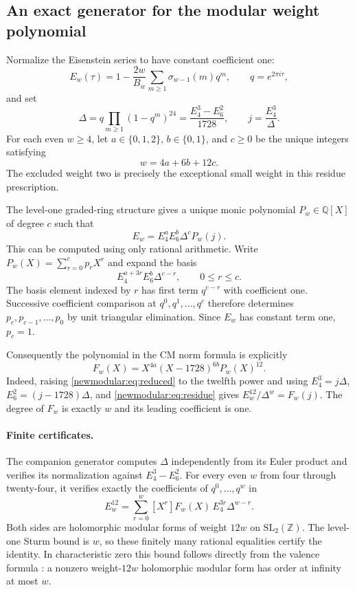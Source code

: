 \subsection{An exact generator for the modular weight polynomial}
\label{newmodular:sec:generator}

Normalize the Eisenstein series to have constant coefficient one:
\[
 E_w(\tau)=1-\frac{2w}{B_w}\sum_{m\ge1}\sigma_{w-1}(m)q^m,
 \qquad q=e^{2\pi i\tau},
\]
and set
\[
 \Delta=q\prod_{m\ge1}(1-q^m)^{24}
       =\frac{E_4^3-E_6^2}{1728},\qquad j=\frac{E_4^3}{\Delta}.
\]
For each even $w\ge4$, let $a\in\{0,1,2\}$, $b\in\{0,1\}$, and
$c\ge0$ be the unique integers satisfying
\begin{equation}\label{newmodular:eq:residue}
 w=4a+6b+12c.
\end{equation}
The excluded weight two is precisely the exceptional small weight in
this residue prescription.

The level-one graded-ring structure \cite{Stein} gives a unique monic polynomial
$P_w\in\mathbb Q[X]$ of degree $c$ such that
\begin{equation}\label{newmodular:eq:reduced}
 E_w=E_4^aE_6^b\Delta^cP_w(j).
\end{equation}
This can be computed using only rational arithmetic.  Write
$P_w(X)=\sum_{r=0}^c p_rX^r$ and expand the basis
\[
 E_4^{a+3r}E_6^b\Delta^{c-r},\qquad 0\le r\le c.
\]
The basis element indexed by $r$ has first term $q^{c-r}$ with
coefficient one.  Successive coefficient comparison at
$q^0,q^1,\ldots,q^c$ therefore determines $p_c,p_{c-1},\ldots,p_0$
by unit triangular elimination.  Since $E_w$ has constant term one,
$p_c=1$.

Consequently the polynomial in the CM norm formula is explicitly
\begin{equation}\label{newmodular:eq:F-factor}
 \boxed{\displaystyle
 F_w(X)=X^{4a}(X-1728)^{6b}P_w(X)^{12}.}
\end{equation}
Indeed, raising \eqref{newmodular:eq:reduced} to the twelfth power and
using $E_4^3=j\Delta$, $E_6^2=(j-1728)\Delta$, and
\eqref{newmodular:eq:residue} gives
$E_w^{12}/\Delta^w=F_w(j)$.  The degree of $F_w$ is exactly $w$
and its leading coefficient is one.

\paragraph{Finite certificates.}
The companion generator computes $\Delta$ independently from its Euler
product and verifies its normalization against $E_4^3-E_6^2$.
For every even $w$ from four through twenty-four, it verifies exactly
the coefficients of $q^0,\ldots,q^w$ in
\begin{equation}\label{newmodular:eq:cleared}
 E_w^{12}=\sum_{r=0}^{w}[X^r]F_w(X)\,
                     E_4^{3r}\Delta^{w-r}.
\end{equation}
Both sides are holomorphic modular forms of weight $12w$ on
$\mathrm{SL}_2(\mathbb Z)$.  The level-one Sturm bound is $w$, so
these finitely many rational equalities certify the identity.  In
characteristic zero this bound follows directly from the valence
formula \cite[Theorem 2.11]{Stein}: a nonzero weight-$12w$ holomorphic modular form has order
at infinity at most $w$.

